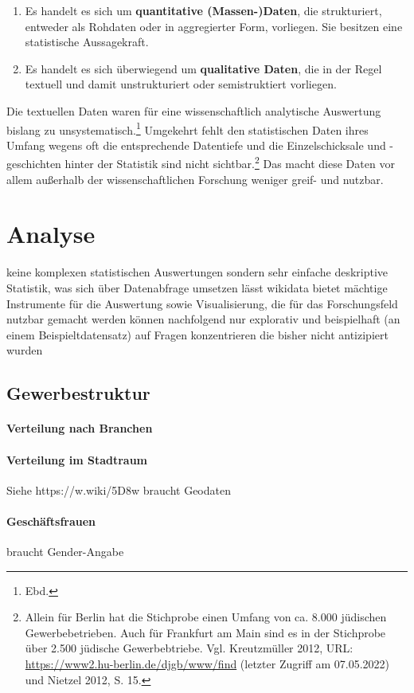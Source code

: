 \begin{enumerate}
    \item Es handelt es sich um \textbf{quantitative (Massen-)Daten}, die strukturiert, entweder als Rohdaten oder in aggregierter Form, vorliegen. Sie besitzen eine statistische Aussagekraft.
    \item Es handelt es sich überwiegend um \textbf{qualitative Daten}, die in der Regel textuell und damit unstrukturiert oder semistruktiert vorliegen.
\end{enumerate}

Die textuellen Daten waren für eine wissenschaftlich analytische Auswertung bislang zu unsystematisch.\footnote{Ebd.} Umgekehrt fehlt den statistischen Daten ihres Umfang wegens oft die entsprechende Datentiefe und die Einzelschicksale und -geschichten hinter der Statistik sind nicht sichtbar.\footnote{Allein für Berlin hat die Stichprobe einen Umfang von ca. 8.000 jüdischen Gewerbebetrieben. Auch für Frankfurt am Main sind es in der Stichprobe über 2.500 jüdische Gewerbebtriebe. Vgl. Kreutzmüller 2012, URL: \url{https://www2.hu-berlin.de/djgb/www/find} (letzter Zugriff am 07.05.2022) und Nietzel 2012, S. 15.} Das macht diese Daten vor allem außerhalb der wissenschaftlichen Forschung weniger greif- und nutzbar. 

\section{Analyse}
keine komplexen statistischen Auswertungen sondern sehr einfache deskriptive Statistik, was sich über Datenabfrage umsetzen lässt
wikidata bietet mächtige Instrumente für die Auswertung sowie Visualisierung, die für das Forschungsfeld nutzbar gemacht werden können
nachfolgend nur explorativ und beispielhaft (an einem Beispieltdatensatz) auf Fragen konzentrieren die bisher nicht antizipiert wurden
\subsection{Gewerbestruktur}
\paragraph{Verteilung nach Branchen}
\paragraph{Verteilung im Stadtraum}
Siehe https://w.wiki/5D8w
braucht Geodaten
\paragraph{Geschäftsfrauen}
braucht Gender-Angabe

